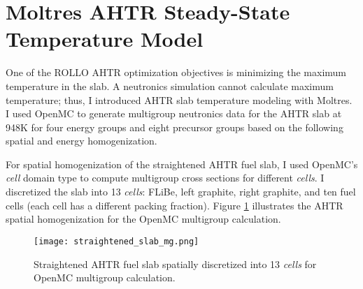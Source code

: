 
\section{Moltres AHTR Steady-State Temperature Model}
One of the ROLLO AHTR optimization objectives is minimizing the maximum 
temperature in the slab. 
A neutronics simulation cannot calculate maximum temperature; thus, I introduced 
AHTR slab temperature modeling with Moltres.
I used OpenMC to generate multigroup neutronics data for the AHTR slab at 948K 
for four energy groups and eight precursor groups based on the following 
spatial and energy homogenization. 

For spatial homogenization of the straightened \gls{AHTR} fuel slab, I used 
OpenMC's \textit{cell} domain type to compute multigroup cross sections for 
different \textit{cells}. 
I discretized the slab into 13 \textit{cells}: FLiBe, left graphite, right 
graphite, and ten fuel cells (each cell has a different packing fraction). 
Figure \ref{fig:straightened_slab_mg} illustrates the \gls{AHTR} spatial 
homogenization for the OpenMC multigroup calculation. 
\begin{figure}[H]
    \centering
    \texttt{[image: straightened\_slab\_mg.png]}
    \raggedright
    \caption{Straightened \acrfull{AHTR} fuel slab spatially discretized into 
    13 \textit{cells} for OpenMC multigroup calculation.}
    \label{fig:straightened_slab_mg}
\end{figure}

